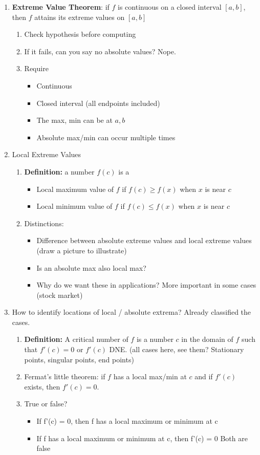 \documentclass{article}
\begin{document}
\begin{enumerate}
\item {\bf Extreme Value Theorem}: if $f$ is continuous on a closed interval $[a,b]$, then $f$ attains its extreme values on $[a,b]$
\begin{enumerate}
\item Check hypothesis before computing
\item If it fails, can you say no absolute values? Nope.
\item Require
\begin{itemize}
\item Continuous
\item Closed interval (all endpoints included)
\item The max, min can be at $a, b$
\item Absolute max/min can occur multiple times
\end{itemize}
\end{enumerate}

\item Local Extreme Values
\begin{enumerate}
\item {\bf Definition:} a number $f(c)$ is a 
\begin{itemize}
\item Local maximum value of $f$ if $f(c)\geq f(x)$ when $x$ is near $c$
\item Local minimum value of $f$ if $f(c)\leq f(x)$ when $x$ is near $c$
\end{itemize}
\item Distinctions:
\begin{itemize}
\item Difference between absolute extreme values and local extreme values (draw a picture to illustrate)
\item Is an absolute max also local max?
\item Why do we want these in applications? More important in some cases (stock market)
\end{itemize}
\end{enumerate}

\item How to identify locations of local / absolute extrema? Already classified the cases.
\begin{enumerate}
\item {\bf Definition:} A critical number of $f$ is a number $c$ in the domain of $f$ such that $f'(c) = 0$ or $f'(c)$ DNE. (all cases here, see them? Stationary points, singular points, end points)
\item Fermat's little theorem: if $f$ has a local max/min at $c$ and if $f'(c)$ exists, then $f'(c) = 0$. 
\item True or false?
\begin{itemize}
\item If f'(c) = 0, then f has a local maximum or minimum at c
\item If f has a local maximum or minimum at c, then f'(c) = 0
Both are false
\end{itemize}
\end{enumerate}


\end{enumerate}
\end{document}
